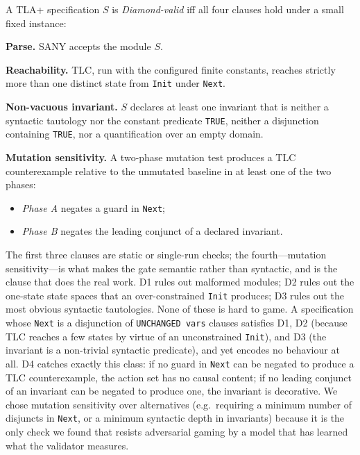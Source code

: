 \documentclass[11pt]{article}
\begin{document}
\begin{tcolorbox}[
  enhanced, breakable,
  colback=cbox, colframe=cline, boxrule=0.5pt,
  arc=2pt, left=8pt, right=8pt, top=4pt, bottom=4pt,
  title=\textbf{Definition (Diamond gate).}, fonttitle=\small,
]
A TLA+ specification $S$ is \emph{Diamond-valid} iff all four clauses
hold under a small fixed instance:
\begin{description}[leftmargin=1.4em, itemsep=1pt]
\item[\textbf{D1.}] \textbf{Parse.} SANY accepts the module $S$.
\item[\textbf{D2.}] \textbf{Reachability.} TLC, run with the configured
  finite constants, reaches strictly more than one distinct state from
  \texttt{Init} under \texttt{Next}.
\item[\textbf{D3.}] \textbf{Non-vacuous invariant.} $S$ declares at least
  one invariant that is neither a syntactic tautology nor the constant
  predicate \texttt{TRUE}, neither a disjunction containing
  \texttt{TRUE}, nor a quantification over an empty domain.
\item[\textbf{D4.}] \textbf{Mutation sensitivity.} A two-phase mutation
  test produces a TLC counterexample relative to the unmutated baseline
  in at least one of the two phases:
  \begin{itemize}[leftmargin=1.2em, itemsep=0pt]
    \item \emph{Phase A} negates a guard in \texttt{Next};
    \item \emph{Phase B} negates the leading conjunct of a declared
      invariant.
  \end{itemize}
\end{description}
\end{tcolorbox}

\noindent The first three clauses are static or single-run checks; the
fourth---mutation sensitivity---is what makes the gate semantic rather
than syntactic, and is the clause that does the real work. D1 rules out
malformed modules; D2 rules out the one-state state spaces that an
over-constrained \texttt{Init} produces; D3 rules out the most obvious
syntactic tautologies. None of these is hard to game. A specification
whose \texttt{Next} is a disjunction of \texttt{UNCHANGED vars} clauses
satisfies D1, D2 (because TLC reaches a few states by virtue of an
unconstrained \texttt{Init}), and D3 (the invariant is a non-trivial
syntactic predicate), and yet encodes no behaviour at all. D4 catches
exactly this class: if no guard in \texttt{Next} can be negated to
produce a TLC counterexample, the action set has no causal content; if
no leading conjunct of an invariant can be negated to produce one, the
invariant is decorative. We chose mutation sensitivity over alternatives
(e.g.\ requiring a minimum number of disjuncts in \texttt{Next}, or a
minimum syntactic depth in invariants) because it is the only check we
found that resists adversarial gaming by a model that has learned what
the validator measures.
\end{document}
